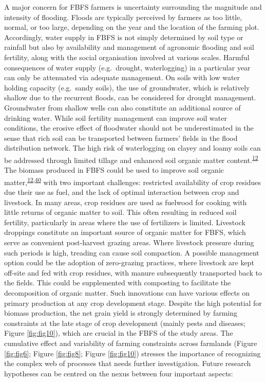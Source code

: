 \documentclass[]{elsarticle} %
\begin{document}
A major concern for FBFS farmers is uncertainty surrounding the magnitude and intensity of flooding. Floods are typically perceived by farmers as too little, normal, or too large, depending on the year and the location of the farming plot. Accordingly, water supply in FBFS is not simply determined by soil type or rainfall but also by availability and management of agronomic flooding and soil fertility, along with the social organisation involved at various scales. Harmful consequences of water supply (e.g.~drought, waterlogging) in a particular year can only be attenuated via adequate management. On soils with low water holding capacity (e.g.~sandy soils), the use of groundwater, which is relatively shallow due to the recurrent floods, can be considered for drought management. Groundwater from shallow wells can also constitute an additional source of drinking water. While soil fertility management can improve soil water conditions, the erosive effect of floodwater should not be underestimated in the sense that rich soil can be transported between farmers' fields in the flood distribution network. The high risk of waterlogging on clayey and loamy soils can be addressed through limited tillage and enhanced soil organic matter content.\textsuperscript{\protect\hyperlink{ref-VanSteenbergen_et_al_2010}{12}} The biomass produced in FBFS could be used to improve soil organic matter,\textsuperscript{\protect\hyperlink{ref-VanSteenbergen_et_al_2010}{12},\protect\hyperlink{ref-Erkossa_et_al_2011}{40}} with two important challenges: restricted availability of crop residues due their use as fuel, and the lack of optimal interaction between crop and livestock. In many areas, crop residues are used as fuelwood for cooking with little returns of organic matter to soil. This often resulting in reduced soil fertility, particularly in areas where the use of fertilizers is limited. Livestock droppings constitute an important source of organic matter for FBFS, which serve as convenient post-harvest grazing areas. Where livestock pressure during such periods is high, treading can cause soil compaction. A possible management option could be the adoption of zero-grazing practices, where livestock are kept off-site and fed with crop residues, with manure subsequently transported back to the fields. This could be supplemented with composting to facilitate the decomposition of organic matter. Such innovations can have various effects on primary production at any crop development stage. Despite the high potential for biomass production, the net grain yield is strongly determined by farming constraints at the late stage of crop development (mainly pests and diseases; Figure \ref{fig:fig10}), which are crucial in the FBFS of the study areas. The cumulative effect and variability of farming constraints across farmlands (Figure \ref{fig:fig6}; Figure \ref{fig:fig8}; Figure \ref{fig:fig10}) stresses the importance of recognizing the complex web of processes that needs further investigation. Future research hypotheses can be centred on the nexus between four important aspects:
\end{document}
